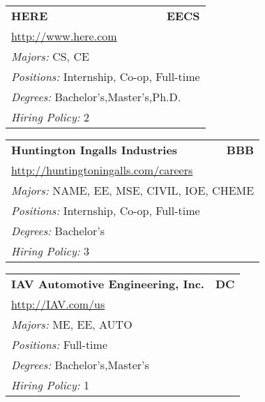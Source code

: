 \documentclass[twoside]{article}
\begin{document}
\begin{center}
\begin{multicols}{3}
\begin{FlushLeft}
\begin{minipage}{.9\columnwidth}
\end{minipage}
 
\begin{minipage}{.9\columnwidth}\begin{tabularx}{.95\columnwidth}{Xr}
                 {\Large\bf HERE} & {\Large\bf EECS}\\
    \multicolumn{2}{p{.95\columnwidth}}{\url{http://www.here.com}}\\
    \multicolumn{2}{p{.95\columnwidth}}{\emph{Majors:} CS, CE}\\
    \multicolumn{2}{p{.95\columnwidth}}{\emph{Positions:} Internship, Co-op, Full-time}\\
    \multicolumn{2}{p{.95\columnwidth}}{\emph{Degrees:} Bachelor's,Master's,Ph.D.}\\
    \multicolumn{2}{p{.95\columnwidth}}{\emph{Hiring Policy:} 2}\\
    \end{tabularx}
    
\end{minipage}
 
\begin{minipage}{.9\columnwidth}\begin{tabularx}{.95\columnwidth}{Xr}
                 {\Large\bf Huntington Ingalls Industries} & {\Large\bf BBB}\\
    \multicolumn{2}{p{.95\columnwidth}}{\url{http://huntingtoningalls.com/careers}}\\
    \multicolumn{2}{p{.95\columnwidth}}{\emph{Majors:} NAME, EE, MSE, CIVIL, IOE, CHEME}\\
    \multicolumn{2}{p{.95\columnwidth}}{\emph{Positions:} Internship, Co-op, Full-time}\\
    \multicolumn{2}{p{.95\columnwidth}}{\emph{Degrees:} Bachelor's}\\
    \multicolumn{2}{p{.95\columnwidth}}{\emph{Hiring Policy:} 3}\\
    \end{tabularx}
    
\end{minipage}
 
\begin{minipage}{.9\columnwidth}\begin{tabularx}{.95\columnwidth}{Xr}
                 {\Large\bf IAV Automotive Engineering, Inc.} & {\Large\bf DC}\\
    \multicolumn{2}{p{.95\columnwidth}}{\url{http://IAV.com/us}}\\
    \multicolumn{2}{p{.95\columnwidth}}{\emph{Majors:} ME, EE, AUTO}\\
    \multicolumn{2}{p{.95\columnwidth}}{\emph{Positions:} Full-time}\\
    \multicolumn{2}{p{.95\columnwidth}}{\emph{Degrees:} Bachelor's,Master's}\\
    \multicolumn{2}{p{.95\columnwidth}}{\emph{Hiring Policy:} 1}\\
    \end{tabularx}
    

\end{minipage}
\end{FlushLeft}
\end{multicols}
\end{center}
\end{document}
